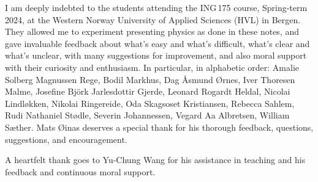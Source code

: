 \documentclass[a4paper,12pt,%
onecolumn,oneside,titlepage,%
british%
]{memoir}
\renewcommand*{\|}[1][]{\nonscript\:#1\vert\nonscript\:\mathopen{}}
\begin{document}
I am deeply indebted to the students attending the ING\,175 course, Spring-term 2024, at the Western Norway University of Applied Sciences (HVL) in Bergen. They allowed me to experiment presenting physics as done in these notes, and gave invaluable feedback about what's easy and what's difficult, what's clear and what's unclear, with many suggestions for improvement, and also moral support with their curiosity and enthusiasm. In particular, in alphabetic order: %
Amalie Solberg Magnussen Rege, %
Bodil Markhus, %
Dag Åsmund Ørnes, %
Iver Thoresen Malme, %
Josefine Björk Jarlesdottir Gjerde, %
Leonard Rogardt Heldal, %
Nicolai Lindløkken, %
Nikolai Ringereide, %
Oda Skagsoset Kristiansen, %
Rebecca Sahlem, %
Rudi Nathaniel Stødle, %
Severin Johannessen, %
Vegard Aa Albretsen, %
William Sæther. %
Mats Øinas deserves a special thank for his thorough feedback, questions, suggestions, and encouragement.

A heartfelt thank goes to Yu-Chung Wang for his assistance in teaching and his feedback and continuous moral support.
\fi
\end{document}
